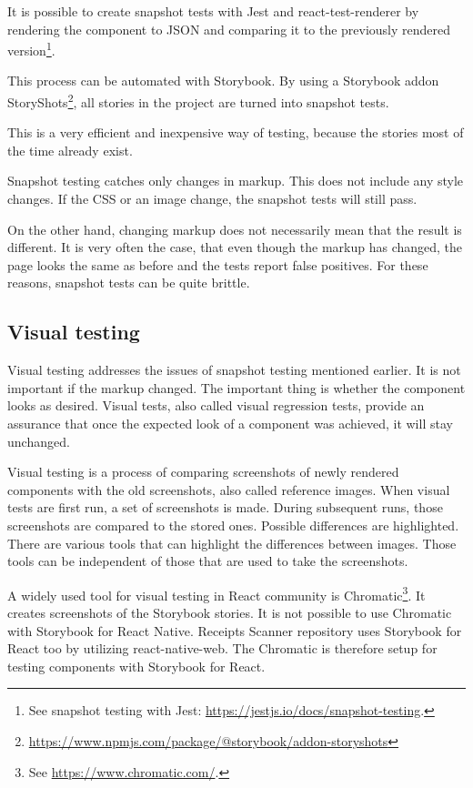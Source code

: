 \documentclass[
  digital, %
  table,   %
  oneside, %
  lof,     %
  lot,     %
]{fithesis3}
\begin{document}
It is possible to create snapshot tests with Jest and react-test-renderer by rendering the component to JSON and comparing it to the previously rendered version\footnote{See snapshot testing with Jest: \url{https://jestjs.io/docs/snapshot-testing}.}.

This process can be automated with Storybook.
By using a Storybook addon StoryShots\footnote{\url{https://www.npmjs.com/package/@storybook/addon-storyshots}}, all stories in the project are turned into snapshot tests. 

This is a very efficient and inexpensive way of testing, because the stories most of the time already exist.

Snapshot testing catches only changes in markup. This does not include any style changes. If the CSS or an image change, the snapshot tests will still pass. 

On the other hand, changing markup does not necessarily mean that the result is different. It is very often the case, that even though the markup has changed, the page looks the same as before and the tests report false positives. For these reasons, snapshot tests can be quite brittle.

\subsection{Visual testing}
\label{sect:visual_testing}
Visual testing addresses the issues of snapshot testing mentioned earlier. It is not important if the markup changed. The important thing is whether the component looks as desired. Visual tests, also called visual regression tests, provide an assurance that once the expected look of a component was achieved, it will stay unchanged.

Visual testing is a process of comparing screenshots of newly rendered components with the old screenshots, also called reference images.
When visual tests are first run, a set of screenshots is made. During subsequent runs, those screenshots are compared to the stored ones. Possible differences are highlighted. There are various tools that can highlight the differences between images. Those tools can be independent of those that are used to take the screenshots.

A widely used tool for visual testing in React community is Chromatic\footnote{See \url{https://www.chromatic.com/}.}. It creates screenshots of the Storybook stories. It is not possible to use Chromatic with Storybook for React Native. Receipts Scanner repository uses Storybook for React too by utilizing react-native-web. The Chromatic is therefore setup for testing components with Storybook for React.
\end{document}
